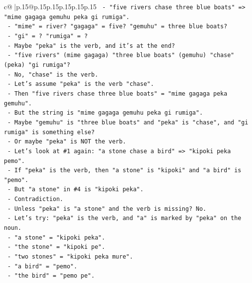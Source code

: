 \documentclass{article}
\begin{document}
{\begin{supertabular}{c@{$\;$}|p{.15\linewidth}@{}p{.15\linewidth}p{.15\linewidth}p{.15\linewidth}p{.15\linewidth}p{.15\linewidth}}
{{{\texttt{              {-} "five rivers chase three blue boats" => "mime gagaga gemuhu peka gi rumiga".} \\
\texttt{              {-} "mime" = river? "gagaga" = five? "gemuhu" = three blue boats?} \\
\texttt{              {-} "gi" = ? "rumiga" = ?} \\
\texttt{              {-} Maybe "peka" is the verb, and it's at the end?} \\
\texttt{              {-} "five rivers" (mime gagaga) "three blue boats" (gemuhu) "chase" (peka) "gi rumiga"?} \\
\texttt{              {-} No, "chase" is the verb.} \\
\texttt{              {-} Let's assume "peka" is the verb "chase".} \\
\texttt{              {-} Then "five rivers chase three blue boats" = "mime gagaga peka gemuhu".} \\
\texttt{              {-} But the string is "mime gagaga gemuhu peka gi rumiga".} \\
\texttt{              {-} Maybe "gemuhu" is "three blue boats" and "peka" is "chase", and "gi rumiga" is something else?} \\
\texttt{              {-} Or maybe "peka" is NOT the verb.} \\
\texttt{              {-} Let's look at \#1 again: "a stone chase a bird" => "kipoki peka pemo".} \\
\texttt{              {-} If "peka" is the verb, then "a stone" is "kipoki" and "a bird" is "pemo".} \\
\texttt{              {-} But "a stone" in \#4 is "kipoki peka".} \\
\texttt{              {-} Contradiction.} \\
\texttt{              {-} Unless "peka" is "a stone" and the verb is missing? No.} \\
\texttt{              {-} Let's try: "peka" is the verb, and "a" is marked by "peka" on the noun.} \\
\texttt{              {-} "a stone" = "kipoki peka".} \\
\texttt{              {-} "the stone" = "kipoki pe".} \\
\texttt{              {-} "two stones" = "kipoki peka mure".} \\
\texttt{              {-} "a bird" = "pemo".} \\
\texttt{              {-} "the bird" = "pemo pe".} \\
}}}
\end{supertabular}}
\end{document}
